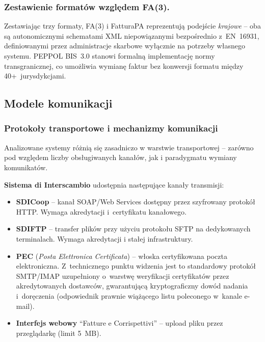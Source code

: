 \subsubsection*{Zestawienie formatów względem FA(3).}
Zestawiając trzy formaty, FA(3) i FatturaPA reprezentują podejście \textit{krajowe} -- oba są autonomicznymi schematami XML niepowiązanymi bezpośrednio z~EN~16931, definiowanymi przez administracje skarbowe wyłącznie na potrzeby własnego systemu. PEPPOL BIS~3.0 stanowi formalną implementację normy transgranicznej, co umożliwia wymianę faktur bez konwersji formatu między 40+~jurysdykcjami.

\subsection{Modele komunikacji}
\label{sec:porownanie-modele-komunikacji}

\subsubsection{Protokoły transportowe i mechanizmy komunikacji}
\label{sec:porownanie-protokoly-transportowe-mechanizmy-komunikacji}

Analizowane systemy różnią się zasadniczo w warstwie transportowej -- zarówno pod względem liczby obsługiwanych kanałów, jak i paradygmatu wymiany komunikatów.

\textbf{Sistema di Interscambio} udostępnia następujące kanały transmisji:

\begin{itemize}
    \item \textbf{SDICoop} -- kanał SOAP/Web Services dostępny przez szyfrowany protokół HTTP. Wymaga akredytacji i~certyfikatu kanałowego.
    \item \textbf{SDIFTP} -- transfer plików przy użyciu protokołu SFTP na dedykowanych terminalach. Wymaga akredytacji i stałej infrastruktury.
    \item \textbf{PEC} (\textit{Posta Elettronica Certificata}) -- włoska certyfikowana poczta elektroniczna. Z~technicznego punktu widzenia jest to standardowy protokół SMTP/IMAP uzupełniony o~warstwę weryfikacji certyfikatów przez akredytowanych dostawców, gwarantującą kryptograficzny dowód nadania i~doręczenia (odpowiednik prawnie wiążącego listu poleconego w~kanale e-mail).
    \item \textbf{Interfejs webowy} ``Fatture e Corrispettivi'' -- upload pliku przez przeglądarkę (limit 5~MB).
\end{itemize}

